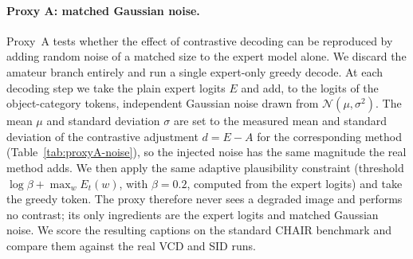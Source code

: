 
\paragraph{Proxy A: matched Gaussian noise.} Proxy~A tests whether the effect of
contrastive decoding can be reproduced by adding random noise of a matched size
to the expert model alone. We discard the amateur branch entirely and run a
single expert-only greedy decode. At each decoding step we take the plain expert
logits $E$ and add, to the logits of the object-category tokens, independent
Gaussian noise drawn from $\mathcal{N}(\mu,\sigma^{2})$. The mean $\mu$ and
standard deviation $\sigma$ are set to the measured mean and standard deviation
of the contrastive adjustment $d = E - A$ for the corresponding method
(Table~\ref{tab:proxyA-noise}), so the injected noise has the same magnitude the
real method adds. We then apply the same adaptive plausibility constraint
(threshold $\log\beta + \max_{w} E_{t}(w)$, with $\beta = 0.2$, computed from the
expert logits) and take the greedy token. The proxy therefore never sees a
degraded image and performs no contrast; its only ingredients are the expert
logits and matched Gaussian noise. We score the resulting captions on the
standard CHAIR benchmark and compare them against the real VCD and SID runs.

